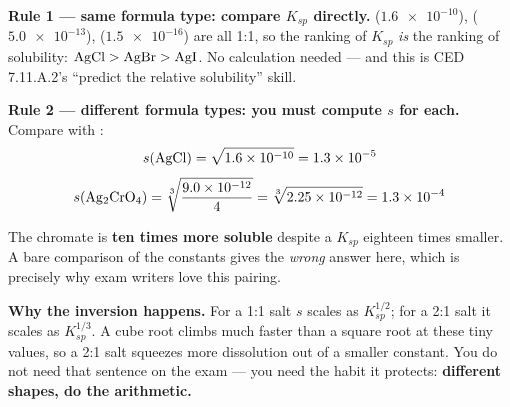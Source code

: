 \documentclass{apchem-worksheet}
\begin{document}
\begin{center}
\end{center}

\begin{workedexample}
\textbf{Rule 1 --- same formula type: compare $K_{sp}$ directly.}
 ($\num{1.6e-10}$),  ($\num{5.0e-13}$), 
($\num{1.5e-16}$) are all 1:1, so the ranking of $K_{sp}$ \emph{is} the
ranking of solubility: $\ce{AgCl} > \ce{AgBr} > \ce{AgI}$. No
calculation needed --- and this is CED 7.11.A.2's ``predict the
relative solubility'' skill.

\textbf{Rule 2 --- different formula types: you must compute $s$ for
each.} Compare  with :
\[ s(\ce{AgCl}) = \sqrt{\num{1.6e-10}} = \num{1.3e-5} \]
\[ s(\ce{Ag2CrO4}) = \sqrt[3]{\frac{\num{9.0e-12}}{4}}
   = \sqrt[3]{\num{2.25e-12}} = \num{1.3e-4} \]

The chromate is \textbf{ten times more soluble} despite a $K_{sp}$
eighteen times smaller. A bare comparison of the constants gives the
\emph{wrong} answer here, which is precisely why exam writers love this
pairing.

\textbf{Why the inversion happens.} For a 1:1 salt $s$ scales as
$K_{sp}^{1/2}$; for a 2:1 salt it scales as $K_{sp}^{1/3}$. A cube
root climbs much faster than a square root at these tiny values, so a
2:1 salt squeezes more dissolution out of a smaller constant. You do
not need that sentence on the exam --- you need the habit it protects:
\textbf{different shapes, do the arithmetic.}
\end{workedexample}
\end{document}
